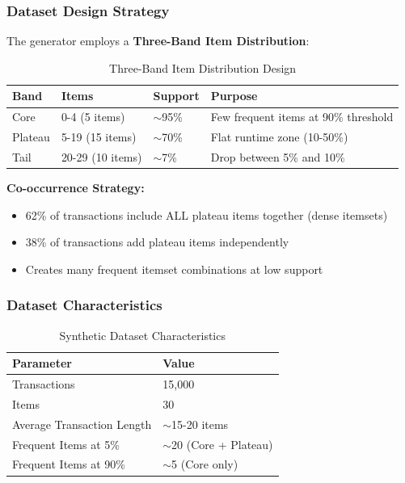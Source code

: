\documentclass[11pt,a4paper]{article}
\begin{document}
\subsubsection{Dataset Design Strategy}

The generator employs a \textbf{Three-Band Item Distribution}:

\begin{table}[H]
\centering
\begin{tabular}{llll}
\toprule
\textbf{Band} & \textbf{Items} & \textbf{Support} & \textbf{Purpose} \\
\midrule
Core & 0-4 (5 items) & $\sim$95\% & Few frequent items at 90\% threshold \\
Plateau & 5-19 (15 items) & $\sim$70\% & Flat runtime zone (10-50\%) \\
Tail & 20-29 (10 items) & $\sim$7\% & Drop between 5\% and 10\% \\
\bottomrule
\end{tabular}
\caption{Three-Band Item Distribution Design}
\end{table}

\textbf{Co-occurrence Strategy:}
\begin{itemize}
    \item 62\% of transactions include ALL plateau items together (dense itemsets)
    \item 38\% of transactions add plateau items independently
    \item Creates many frequent itemset combinations at low support
\end{itemize}

\subsubsection{Dataset Characteristics}

\begin{table}[H]
\centering
\begin{tabular}{ll}
\toprule
\textbf{Parameter} & \textbf{Value} \\
\midrule
Transactions & 15,000 \\
Items & 30 \\
Average Transaction Length & $\sim$15-20 items \\
Frequent Items at 5\% & $\sim$20 (Core + Plateau) \\
Frequent Items at 90\% & $\sim$5 (Core only) \\
\bottomrule
\end{tabular}
\caption{Synthetic Dataset Characteristics}
\end{table}
\end{document}
